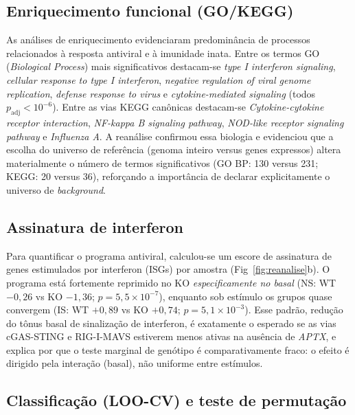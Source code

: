\documentclass[10pt,letterpaper]{article}
\newcommand{\gene}[1]{\textit{#1}}
\begin{document}
\subsection*{Enriquecimento funcional (GO/KEGG)}

As análises de enriquecimento evidenciaram predominância de processos
relacionados à resposta antiviral e à imunidade inata. Entre os termos GO
(\emph{Biological Process}) mais significativos destacam-se
\emph{type I interferon signaling}, \emph{cellular response to type I
interferon}, \emph{negative regulation of viral genome replication},
\emph{defense response to virus} e \emph{cytokine-mediated signaling}
(todos \(p_{\mathrm{adj}} < 10^{-6}\)). Entre as vias KEGG canônicas
destacam-se \emph{Cytokine-cytokine receptor interaction}, \emph{NF-kappa B
signaling pathway}, \emph{NOD-like receptor signaling pathway} e
\emph{Influenza A}. A reanálise confirmou essa biologia e evidenciou que a
escolha do universo de referência (genoma inteiro versus genes expressos)
altera materialmente o número de termos significativos (GO BP: 130 versus 231;
KEGG: 20 versus 36), reforçando a importância de declarar explicitamente o
universo de \emph{background}.

\subsection*{Assinatura de interferon}

Para quantificar o programa antiviral, calculou-se um escore de assinatura de
genes estimulados por interferon (ISGs) por amostra (Fig~\ref{fig:reanalise}b).
O programa está fortemente reprimido no KO \emph{especificamente no basal}
(NS: WT \(-0{,}26\) vs KO \(-1{,}36\); \(p = 5{,}5\times10^{-7}\)), enquanto sob
estímulo os grupos quase convergem (IS: WT \(+0{,}89\) vs KO \(+0{,}74\);
\(p = 5{,}1\times10^{-3}\)). Esse padrão, redução do tônus basal de
sinalização de interferon, é exatamente o esperado se as vias cGAS-STING e
RIG-I-MAVS estiverem menos ativas na ausência de \gene{APTX}, e explica por que
o teste marginal de genótipo é comparativamente fraco: o efeito é dirigido pela
interação (basal), não uniforme entre estímulos.

\subsection*{Classificação (LOO-CV) e teste de permutação}
\end{document}
